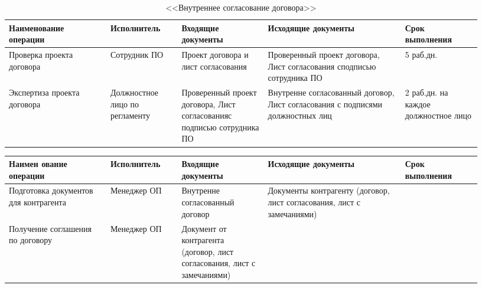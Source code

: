 \documentclass[a4paper,14pt]{extarticle}
\begin{document}
\begin{landscape}
	\begin{table}[htbp]
		\small
		\begin{center}
			\begin{tabular}{|p{0.2\linewidth}|p{0.14\linewidth}|p{0.17\linewidth}|p{0.27\linewidth}|p{0.15\linewidth}|}
				\hline
				\textbf{Наименование операции} & \textbf{Исполнитель} & \textbf{Входящие документы} & \textbf{Исходящие документы} & \textbf{Срок выполнения} \\ \hline
				Проверка проекта
				договора
				& Сотрудник ПО & Проект
				договора и
				лист
				согласования
				& Проверенный проект
				договора, Лист
				согласования сподписью
				сотрудника ПО
				& 5 раб.дн. \\ \hline
				Экспертиза
				проекта
				договора
				& Должностное
				лицо по
				регламенту
				& Проверенный
				проект
				договора,
				Лист
				согласованияс
				подписью
				сотрудника
				ПО
				& Внутренне
				согласованный договор,
				Лист согласования с
				подписями
				должностных лиц
				& 2 раб.дн. на
				каждое
				должностное
				лицо
				\\ \hline
			\end{tabular}
		\end{center}
	\caption{<<Внутреннее согласование договора>>}
		\label{}
	\end{table}
\newpage
{}

\begin{table}[htbp]
	\small
	\begin{center}
		\begin{tabular}{|p{0.2\linewidth}|p{0.14\linewidth}|p{0.17\linewidth}|p{0.27\linewidth}|p{0.15\linewidth}|}
			\hline
			\textbf{Наимен	ование операции} & \textbf{Исполнитель} & \textbf{Входящие документы} & \textbf{Исходящие документы} & \textbf{Срок выполнения} \\ \hline
			Подготовка
			документов для
			контрагента
			
			& Менеджер ОП & Внутренне
			согласованный
			договор
			
			& Документы контрагенту
			(договор, лист
			согласования, лист с
			замечаниями)
			
			& \\ \hline
			Получение
			соглашения по
			договору
			
			& Менеджер ОП
			
			& Документ от
			контрагента
			(договор, лист
			согласования,
			лист с
			замечаниями)
			

\end{tabular}
\end{center}
\end{table}
\end{landscape}
\end{document}
